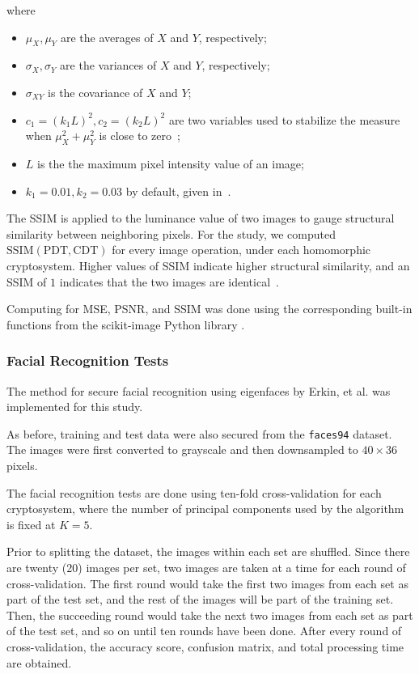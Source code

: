 \begin{description}
	where
	\begin{itemize}
		\item $\mu_X, \mu_Y$ are the averages of $X$ and $Y$, respectively;
		\item $\sigma_X, \sigma_Y$ are the variances of $X$ and $Y$, respectively;
		\item $\sigma_{XY}$ is the covariance of $X$ and $Y$;
		\item $c_1 = (k_1L)^2, c_2 = (k_2L)^2$ are two variables used to stabilize the measure when $\mu_X^2+\mu_Y^2$ is close to zero~\cite{akramullah_video_2014};
		\item $L$ is the the maximum pixel intensity value of an image;
		\item $k_1 = 0.01, k_2 = 0.03$ by default, given in~\cite{ahmed_benchmark_2016}.
	\end{itemize}
	The SSIM is applied to the luminance value of two images to gauge structural similarity between neighboring pixels.
	For the study, we computed $\mathrm{SSIM}(\mathrm{PDT}, \mathrm{CDT})$ for every image operation, under each homomorphic cryptosystem. Higher values of SSIM indicate higher structural similarity, and an SSIM of $1$ indicates that the two images are identical~\cite{ahmed_benchmark_2016}.
\end{description}

Computing for MSE, PSNR, and SSIM was done using the corresponding built-in functions from the scikit-image Python library \cite{scikit-image}.

\subsubsection{Facial Recognition Tests}
The method for secure facial recognition using eigenfaces by Erkin, et al. \cite{hutchison_privacy-preserving_2009} was implemented for this study.

As before, training and test data were also secured from the \texttt{faces94} dataset. The images were first converted to grayscale and then downsampled to $40 \times 36$ pixels.

The facial recognition tests are done using ten-fold cross-validation for each cryptosystem, where the number of principal components used by the algorithm is fixed at $K=5$.

Prior to splitting the dataset, the images within each set are shuffled. Since there are twenty (20) images per set, two images are taken at a time for each round of cross-validation. The first round would take the first two images from each set as part of the test set, and the rest of the images will be part of the training set. Then, the succeeding round would take the next two images from each set as part of the test set, and so on until ten rounds have been done. After every round of cross-validation, the accuracy score, confusion matrix, and total processing time are obtained.

